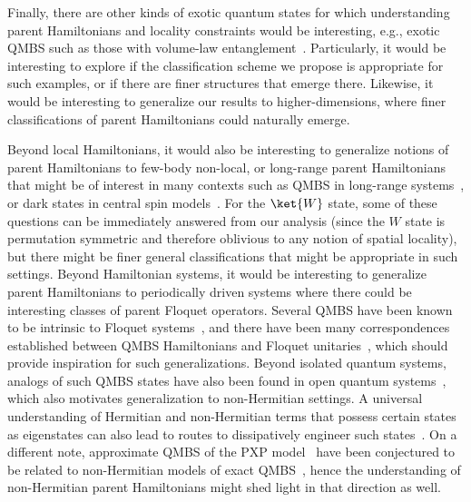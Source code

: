 \documentclass[prx,letterpaper,aps,superscriptaddress,floatfix,twocolumn,nofootinbib]{revtex4-2}
\theoremstyle{definition}
\begin{document}
%
Finally, there are other kinds of exotic quantum states for which understanding parent Hamiltonians and locality constraints would be interesting, e.g., exotic QMBS such as those with volume-law entanglement~\cite{Langlett_2022,ivanov2024volume,chiba2024exact, mohapatra2024exact}.
%
Particularly, it would be interesting to explore if the classification scheme we propose is appropriate for such examples, or if there are finer structures that emerge there. 
%
Likewise, it would be interesting to generalize our results to higher-dimensions, where finer classifications of parent Hamiltonians could naturally emerge.
%

%
Beyond local Hamiltonians, it would also be interesting to generalize notions of parent Hamiltonians to few-body non-local, or long-range parent Hamiltonians that might be of interest in many contexts such as QMBS in long-range systems~\cite{lerose2025theory}, or dark states in central spin models~\cite{villazon2020persistent}.
%
For the $\ket{W}$ state, some of these questions can be immediately answered from our analysis (since the $W$ state is permutation symmetric and therefore oblivious to any notion of spatial locality), but there might be finer general classifications that might be appropriate in such settings. 
%
Beyond Hamiltonian systems, it would be interesting to generalize parent Hamiltonians to periodically driven systems where there could be interesting classes of parent Floquet operators.
%
Several QMBS have been known to be intrinsic to Floquet systems~\cite{sugiura2021manybody, Mizuta2020Exact, ljubotina2024tangent}, and there have been many correspondences established between QMBS Hamiltonians and Floquet unitaries~\cite{Rozon_2022, rozon2023broken}, which should provide inspiration for such generalizations. 
%
Beyond isolated quantum systems, analogs of such QMBS states have also been found in open quantum systems~\cite{buca2019nonstationary, tindall2020quantum, wang2024embedding, marche2025exceptional, garcia2025lindblad, gotta2025open}, which also motivates generalization to non-Hermitian settings. 
%
A universal understanding of Hermitian and non-Hermitian terms that possess certain states as eigenstates can also lead to routes to dissipatively engineer such states~\cite{wang2024embedding}. 
%
On a different note, approximate QMBS of the PXP model~\cite{Turner_2018weak, Turner_2018quantum, Iadecola_2019, Lin_2019, Surace_2020, Serbyn_2021, Desaules2022SchwingerScars, Desaules2023weak, Su2023observation, Daniel2023bridging, Ivanov_2025exact, Mark2025observation} have been conjectured to be related to non-Hermitian models of exact QMBS~\cite{Omiya_2023quantum, Omiya_2023fractionalization}, hence the understanding of non-Hermitian parent Hamiltonians might shed light in that direction as well.
%
\end{document}
